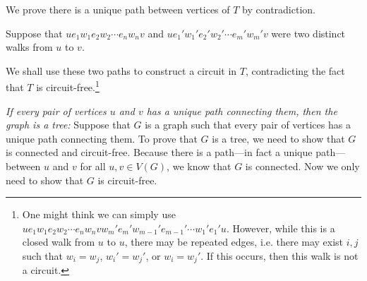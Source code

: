 \documentclass[11pt,letterpaper]{article}
\begin{document}
We prove there is a unique path between vertices of $T$ by contradiction. 

Suppose that $u e_1 w_1 e_2 w_2 \cdots e_n w_n v$ and $u e_1' w_1' e_2' w_2' \cdots e_m' w_m' v$ were two distinct walks from $u$ to $v$. 

We shall use these two paths to construct a circuit in $T$, contradicting the fact that $T$ is circuit-free.\footnote{One might think we can simply use $u e_1 w_1 e_2 w_2 \cdots e_n w_n v w_m' e_m' w_{m-1}' e_{m-1}' \cdots w_1' e_1' u$. However, while this is a closed walk from $u$ to $u$, there may be repeated edges, i.e. there may exist $i, j$ such that $w_i= w_j$, $w_i'= w_j'$, or $w_i= w_j'$. If this occurs, then this walk is not a circuit.}


























\newpage


{\itshape If every pair of vertices $u$ and $v$ has a unique path connecting them, then the graph is a tree:} Suppose that $G$ is a graph such that every pair of vertices has a unique path connecting them. To prove that $G$ is a tree, we need to show that $G$ is connected and circuit-free. Because there is a path---in fact a unique path---between $u$ and $v$ for all $u, v \in V(G)$, we know that $G$ is connected. Now we only need to show that $G$ is circuit-free. \pspace
\end{document}
